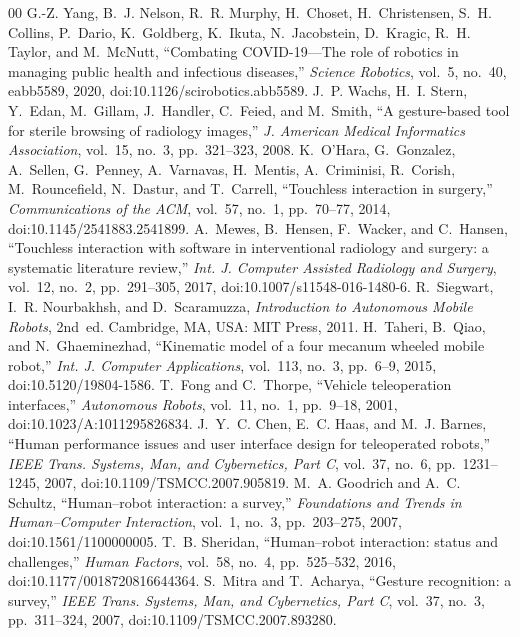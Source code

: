 \documentclass[5p,twocolumn]{elsarticle}
\begin{document}
\FloatBarrier
\begin{thebibliography}{00}
 G.-Z. Yang, B.~J. Nelson, R.~R. Murphy, H.~Choset, H.~Christensen, S.~H. Collins, P.~Dario, K.~Goldberg, K.~Ikuta, N.~Jacobstein, D.~Kragic, R.~H. Taylor, and M.~McNutt, ``Combating COVID-19---The role of robotics in managing public health and infectious diseases,'' \emph{Science Robotics}, vol.~5, no.~40, eabb5589, 2020, doi:10.1126/scirobotics.abb5589.
 J.~P. Wachs, H.~I. Stern, Y.~Edan, M.~Gillam, J.~Handler, C.~Feied, and M.~Smith, ``A gesture-based tool for sterile browsing of radiology images,'' \emph{J. American Medical Informatics Association}, vol.~15, no.~3, pp.~321--323, 2008.
 K.~O'Hara, G.~Gonzalez, A.~Sellen, G.~Penney, A.~Varnavas, H.~Mentis, A.~Criminisi, R.~Corish, M.~Rouncefield, N.~Dastur, and T.~Carrell, ``Touchless interaction in surgery,'' \emph{Communications of the ACM}, vol.~57, no.~1, pp.~70--77, 2014, doi:10.1145/2541883.2541899.
 A.~Mewes, B.~Hensen, F.~Wacker, and C.~Hansen, ``Touchless interaction with software in interventional radiology and surgery: a systematic literature review,'' \emph{Int. J. Computer Assisted Radiology and Surgery}, vol.~12, no.~2, pp.~291--305, 2017, doi:10.1007/s11548-016-1480-6.
 R.~Siegwart, I.~R. Nourbakhsh, and D.~Scaramuzza, \emph{Introduction to Autonomous Mobile Robots}, 2nd~ed. Cambridge, MA, USA: MIT Press, 2011.
 H.~Taheri, B.~Qiao, and N.~Ghaeminezhad, ``Kinematic model of a four mecanum wheeled mobile robot,'' \emph{Int. J. Computer Applications}, vol.~113, no.~3, pp.~6--9, 2015, doi:10.5120/19804-1586.
 T.~Fong and C.~Thorpe, ``Vehicle teleoperation interfaces,'' \emph{Autonomous Robots}, vol.~11, no.~1, pp.~9--18, 2001, doi:10.1023/A:1011295826834.
 J.~Y.~C. Chen, E.~C. Haas, and M.~J. Barnes, ``Human performance issues and user interface design for teleoperated robots,'' \emph{IEEE Trans. Systems, Man, and Cybernetics, Part C}, vol.~37, no.~6, pp.~1231--1245, 2007, doi:10.1109/TSMCC.2007.905819.
 M.~A. Goodrich and A.~C. Schultz, ``Human--robot interaction: a survey,'' \emph{Foundations and Trends in Human--Computer Interaction}, vol.~1, no.~3, pp.~203--275, 2007, doi:10.1561/1100000005.
 T.~B. Sheridan, ``Human--robot interaction: status and challenges,'' \emph{Human Factors}, vol.~58, no.~4, pp.~525--532, 2016, doi:10.1177/0018720816644364.
 S.~Mitra and T.~Acharya, ``Gesture recognition: a survey,'' \emph{IEEE Trans. Systems, Man, and Cybernetics, Part C}, vol.~37, no.~3, pp.~311--324, 2007, doi:10.1109/TSMCC.2007.893280.

\end{thebibliography}
\end{document}
